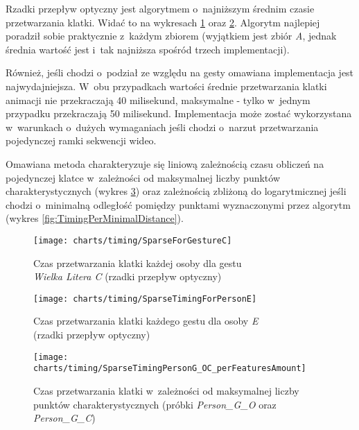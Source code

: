     \newpage
    Rzadki przepływ optyczny jest algorytmem o~najniższym średnim czasie przetwarzania klatki. Widać to na wykresach \ref{fig:SparseForGestureC} oraz \ref{fig:SparseTimingForPersonE}. Algorytm najlepiej poradził sobie praktycznie z~każdym zbiorem (wyjątkiem jest zbiór \textit{A}, jednak średnia wartość jest i~tak najniższa spośród trzech implementacji).

    Również, jeśli chodzi o~podział ze względu na gesty omawiana implementacja jest najwydajniejsza. W~obu przypadkach wartości średnie przetwarzania klatki animacji nie przekraczają 40 milisekund, maksymalne - tylko w~jednym przypadku przekraczają 50 milisekund. Implementacja może zostać wykorzystana w~warunkach o~dużych wymaganiach jeśli chodzi o~narzut przetwarzania pojedynczej ramki sekwencji wideo.

    Omawiana metoda charakteryzuje się liniową zależnością czasu obliczeń na pojedynczej klatce w~zależności od maksymalnej liczby punktów charakterystycznych (wykres \ref{fig:TimingPerFeaturesAmount}) oraz zależnością zbliżoną do logarytmicznej jeśli chodzi o~minimalną odległość pomiędzy punktami wyznaczonymi przez algorytm (wykres \ref{fig:TimingPerMinimalDistance}).

      \begin{figure}[!ht]
        \centering
        \texttt{[image: charts/timing/SparseForGestureC]}
        \caption[Czas przetwarzania klatki każdej osoby dla gestu C (rzadki przepływ optyczny)]
                {Czas przetwarzania klatki każdej osoby dla gestu\\\textit{Wielka Litera C} (rzadki przepływ optyczny)}
        \label{fig:SparseForGestureC}
      \end{figure}

      \begin{figure}[!ht]
        \centering
        \texttt{[image: charts/timing/SparseTimingForPersonE]}
        \caption[Czas przetwarzania klatki każdego gestu dla osoby E (rzadki przepływ optyczny)]
                {Czas przetwarzania klatki każdego gestu dla osoby \textit{E}\\(rzadki przepływ optyczny)}
        \label{fig:SparseTimingForPersonE}
      \end{figure}

    \newpage
      \begin{figure}[!ht]
        \centering
        \texttt{[image: charts/timing/SparseTimingPersonG\_OC\_perFeaturesAmount]}
        \caption[Czas przetwarzania klatki w~zależności od maksymalnej liczby punktów charakterystycznych]
                {Czas przetwarzania klatki w~zależności od maksymalnej liczby punktów charakterystycznych (próbki \textit{Person\_G\_O} oraz \textit{Person\_G\_C})}
        \label{fig:TimingPerFeaturesAmount}
      \end{figure}

